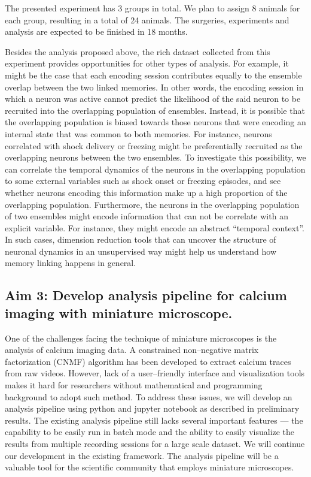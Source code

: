 \documentclass[master.tex]{subfiles}
\begin{document}
The presented experiment has 3 groups in total. We plan to assign 8 animals for
each group, resulting in a total of 24 animals. The surgeries, experiments and
analysis are expected to be finished in 18 months.

Besides the analysis proposed above, the rich dataset collected from this
experiment provides opportunities for other types of analysis. For example, it
might be the case that each encoding session contributes equally to the ensemble
overlap between the two linked memories. In other words, the encoding session in
which a neuron was active cannot predict the likelihood of the said neuron to be
recruited into the overlapping population of ensembles. Instead, it is possible
that the overlapping population is biased towards those neurons that were
encoding an internal state that was common to both memories. For instance,
neurons correlated with shock delivery or freezing might be preferentially
recruited as the overlapping neurons between the two ensembles. To investigate
this possibility, we can correlate the temporal dynamics of the neurons in the
overlapping population to some external variables such as shock onset or
freezing episodes, and see whether neurons encoding this information make up a
high proportion of the overlapping population. Furthermore, the neurons in the
overlapping population of two ensembles might encode information that can not be
correlate with an explicit variable. For instance, they might encode an abstract
``temporal context''. In such cases, dimension reduction tools that can uncover
the structure of neuronal dynamics in an unsupervised way might help us
understand how memory linking happens in general.

\subsection*{Aim 3: Develop analysis pipeline for calcium imaging with miniature
  microscope.}

One of the challenges facing the technique of miniature microscopes is the
analysis of calcium imaging data. A constrained non--negative matrix
factorization (CNMF) algorithm  has been developed to extract calcium traces from
raw videos. However, lack of a user--friendly interface and visualization tools
makes it hard for researchers without mathematical and programming background to
adopt such method. To address these issues, we will develop an analysis pipeline
using python and jupyter notebook as described in preliminary results. The
existing analysis pipeline still lacks several important features --- the capability to be easily run in batch mode and
the ability to easily visualize the results from multiple recording sessions for
a large scale dataset. We will continue our development in the existing
framework. The analysis pipeline will be a valuable tool for the scientific
community that employs miniature microscopes.
\end{document}
